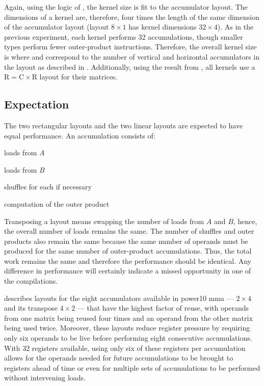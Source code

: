 \documentclass[\main/thesis.tex]{subfiles}
\begin{document}
Again, using the logic of , the kernel size is fit to the accumulator layout.
The dimensions of a kernel are, therefore, four times the length of the same dimension of the accumulator layout (\eg layout $8 \times 1$ has kernel dimensions $32 \times 4$).
As in the previous experiment, each kernel performs 32 accumulations, though smaller types perform fewer outer-product instructions.
Therefore, the overall kernel size is  where  and  correspond to the number of vertical and horizontal accumulators in the layout as described in .
Additionally, using the result from , all kernels use a $\textrm{R} = \textrm{C} \times \textrm{R}$ layout for their matrices.

\subsection{Expectation}
\label{sec:layoutExpectation}
The two rectangular layouts and the two linear layouts are expected to have equal performance.
An accumulation consists of:
\begin{enumerate*}[itemjoin={{; }}, itemjoin*={{; and finally }}, label={}, afterlabel={}, after={.}]
  \item loads from $A$
  \item loads from $B$
  \item shuffles for each if necessary
  \item computation of the outer product
\end{enumerate*}
Transposing a layout means swapping the number of loads from $A$ and $B$, hence, the overall number of loads remains the same.
The number of shuffles and outer products also remain the same because the same number of operands must be produced for the same number of outer-product accumulations.
Thus, the total work remains the same and therefore the performance should be identical.
Any difference in performance will certainly indicate a missed opportunity in one of the compilations.

 describes layouts for the eight accumulators available in \gls{power10} \gls{mma} --- $2 \times 4$ and its transpose $4 \times 2$ --- that have the highest factor of reuse, with operands from one matrix being reused four times and an operand from the other matrix being used twice.
Moreover, these layouts reduce register pressure by requiring only six operands to be \gls{live} before performing eight consecutive accumulations.
With 32 registers available, using only six of these registers per accumulation allows for the operands needed for future accumulations to be brought to registers ahead of time or even for multiple sets of accumulations to be performed without intervening loads.
\end{document}
